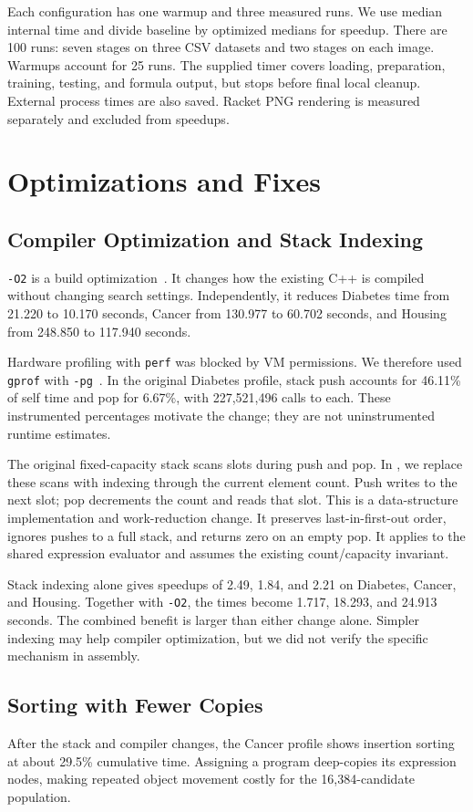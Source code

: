 \documentclass[sigplan,nonacm]{acmart}
\begin{document}
Each configuration has one warmup and three measured runs. We use median internal time and divide baseline by optimized medians for speedup. There are 100 runs: seven stages on three CSV datasets and two stages on each image. Warmups account for 25 runs. The supplied timer covers loading, preparation, training, testing, and formula output, but stops before final local cleanup. External process times are also saved. Racket PNG rendering is measured separately and excluded from speedups.

\section{Optimizations and Fixes}
\subsection{Compiler Optimization and Stack Indexing}
\texttt{-O2} is a build optimization~\cite{gcc}. It changes how the existing C++ is compiled without changing search settings. Independently, it reduces Diabetes time from 21.220 to 10.170 seconds, Cancer from 130.977 to 60.702 seconds, and Housing from 248.850 to 117.940 seconds.

Hardware profiling with \texttt{perf} was blocked by VM permissions. We therefore used \texttt{gprof} with \texttt{-pg}~\cite{gprof}. In the original Diabetes profile, stack push accounts for 46.11\% of self time and pop for 6.67\%, with 227,521,496 calls to each. These instrumented percentages motivate the change; they are not uninstrumented runtime estimates.

The original fixed-capacity stack scans slots during push and pop. In , we replace these scans with indexing through the current element count. Push writes to the next slot; pop decrements the count and reads that slot. This is a data-structure implementation and work-reduction change. It preserves last-in-first-out order, ignores pushes to a full stack, and returns zero on an empty pop. It applies to the shared expression evaluator and assumes the existing count/capacity invariant.

Stack indexing alone gives speedups of 2.49, 1.84, and 2.21 on Diabetes, Cancer, and Housing. Together with \texttt{-O2}, the times become 1.717, 18.293, and 24.913 seconds. The combined benefit is larger than either change alone. Simpler indexing may help compiler optimization, but we did not verify the specific mechanism in assembly.

\subsection{Sorting with Fewer Copies}
After the stack and compiler changes, the Cancer profile shows insertion sorting at about 29.5\% cumulative time. Assigning a program deep-copies its expression nodes, making repeated object movement costly for the 16,384-candidate population.
\end{document}

